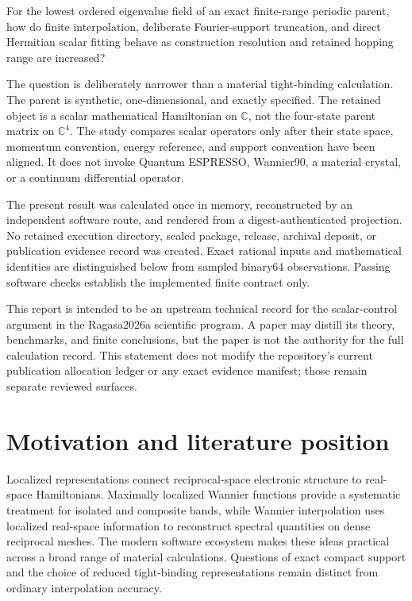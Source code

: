 \documentclass[11pt]{article}
\newcommand{\C}{\mathbb{C}}
\begin{document}
For the lowest ordered eigenvalue field of an exact finite-range periodic parent, how do
finite interpolation, deliberate Fourier-support truncation, and direct Hermitian scalar
fitting behave as construction resolution and retained hopping range are increased?

The question is deliberately narrower than a material tight-binding calculation.  The
parent is synthetic, one-dimensional, and exactly specified.  The retained object is a
scalar mathematical Hamiltonian on $\C$, not the four-state parent matrix on $\C^4$.
The study compares scalar operators only after their state space, momentum convention,
energy reference, and support convention have been aligned.  It does not invoke Quantum
ESPRESSO, Wannier90, a material crystal, or a continuum differential operator.

The present result was calculated once in memory, reconstructed by an independent
software route, and rendered from a digest-authenticated projection.  No retained
execution directory, sealed package, release, archival deposit, or publication evidence
record was created.  Exact rational inputs and mathematical identities are distinguished
below from sampled binary64 observations.  Passing software checks establish the
implemented finite contract only.

This report is intended to be an upstream technical record for the scalar-control
argument in the Ragasa2026a scientific program.  A paper may distill its theory,
benchmarks, and finite conclusions, but the paper is not the authority for the full
calculation record.  This statement does not modify the repository's current publication
allocation ledger or any exact evidence manifest; those remain separate reviewed
surfaces.

\section{Motivation and literature position}

Localized representations connect reciprocal-space electronic structure to real-space
Hamiltonians.  Maximally localized Wannier functions provide a systematic treatment for
isolated and composite bands\cite{marzari1997,souza2001,marzari2012}, while Wannier
interpolation uses localized real-space information to reconstruct spectral quantities
on dense reciprocal meshes\cite{yates2007}.  The modern software ecosystem makes these
ideas practical across a broad range of material calculations\cite{marrazzo2024}.
Questions of exact compact support and the choice of reduced tight-binding
representations remain distinct from ordinary interpolation
accuracy\cite{sathe2024,ghosh2025}.
\end{document}
